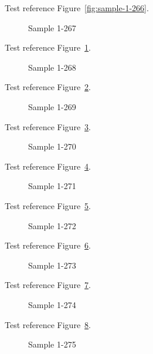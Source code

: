 Test reference Figure~\ref{fig:sample-1-266}.

\begin{figure}[tbhp]
\caption{Sample 1-267}
\label{fig:sample-1-267}
\end{figure}

Test reference Figure~\ref{fig:sample-1-267}.

\begin{figure}[tbhp]
\caption{Sample 1-268}
\label{fig:sample-1-268}
\end{figure}

Test reference Figure~\ref{fig:sample-1-268}.

\begin{figure}[tbhp]
\caption{Sample 1-269}
\label{fig:sample-1-269}
\end{figure}

Test reference Figure~\ref{fig:sample-1-269}.

\begin{figure}[tbhp]
\caption{Sample 1-270}
\label{fig:sample-1-270}
\end{figure}

Test reference Figure~\ref{fig:sample-1-270}.

\begin{figure}[tbhp]
\caption{Sample 1-271}
\label{fig:sample-1-271}
\end{figure}

Test reference Figure~\ref{fig:sample-1-271}.

\begin{figure}[tbhp]
\caption{Sample 1-272}
\label{fig:sample-1-272}
\end{figure}

Test reference Figure~\ref{fig:sample-1-272}.

\begin{figure}[tbhp]
\caption{Sample 1-273}
\label{fig:sample-1-273}
\end{figure}

Test reference Figure~\ref{fig:sample-1-273}.

\begin{figure}[tbhp]
\caption{Sample 1-274}
\label{fig:sample-1-274}
\end{figure}

Test reference Figure~\ref{fig:sample-1-274}.

\begin{figure}[tbhp]
\caption{Sample 1-275}
\label{fig:sample-1-275}
\end{figure}

